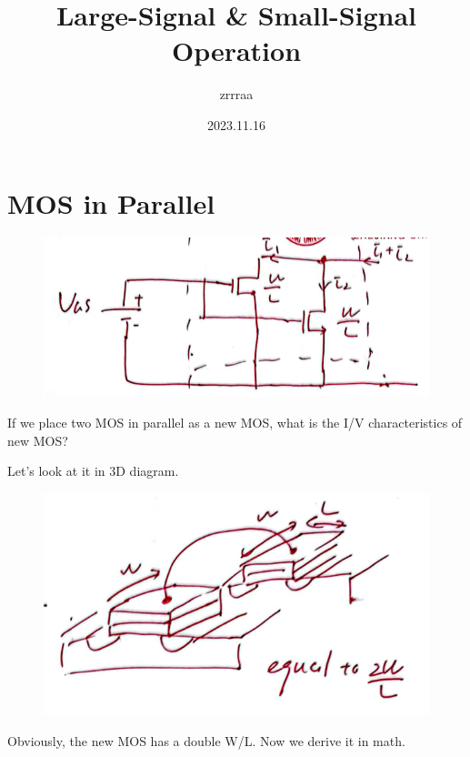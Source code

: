 \documentclass[fontset=windows]{article}
\title{\heiti\zihao{2} Large-Signal \& Small-Signal Operation}
\author{\songti zrrraa}
\date{2023.11.16}
\begin{document}
\maketitle
\thispagestyle{empty}

\section*{MOS in Parallel}

\begin{figure}[htbp]
    \centering
    \includegraphics[scale=0.6]{1.jpg}
    \captionsetup{labelformat=empty}
    \caption{}
    \label{1}
\end{figure}

If we place two MOS in parallel as a new MOS, what is the I/V characteristics of new MOS? 

Let's look at it in 3D diagram. 

\begin{figure}[htbp]
    \centering
    \includegraphics[scale=0.6]{2.jpg}
    \captionsetup{labelformat=empty}
    \caption{}
    \label{2}
\end{figure}

Obviously, the new MOS has a double W/L. Now we derive it in math. 
\end{document}
